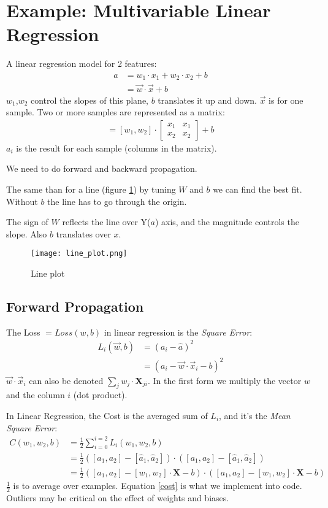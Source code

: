 \section{Example: Multivariable Linear Regression}
A linear regression model for 2 features:
\begin{align*}
 a &= w_1\cdot x_1 + w_2\cdot x_2 + b \\
   &= \vec{w}\cdot\vec{x} + b
\end{align*}
$w_1$,$w_2$ control the slopes of this plane, $b$ translates it up and down. $\vec{x}$ is for one sample. Two or more samples are represented as a matrix:
\begin{align*}
[a_1, a_2] = 
  [w_1, w_2]\cdot{}
  \begin{bmatrix}
  x_1 & x_1\\
  x_2 & x_2 
  \end{bmatrix}
 +  b
\end{align*}
$a_i$ is the result for each sample (columns in the matrix).

We need to do forward and backward propagation.

The same than for a line (figure \ref{fig:line}) by tuning $W$ and $b$  we can find the best fit. Without $b$ the line has to go through the origin. 

The sign of $W$ reflects the line over Y($a$) axis, and the magnitude controls the slope. Also $b$ translates over $x$.

\begin{figure}[h]
 \centering
 \texttt{[image: line\_plot.png]}
  \caption{Line plot} \label{fig:line}
\end{figure}


\subsection{Forward Propagation}
The Loss $= Loss(w,b)$ in linear regression is the \textit{Square Error}:
\begin{align*}
  L_i(\vec{w}, b) &= (a_i - \hat{a})^2\\
  &=(a_i -\vec{w}\cdot{}\vec{x}_{i} -b)^2
\end{align*}
$\vec{w}\cdot{}\vec{x}_i$ can also be denoted $\sum_jw_j\cdot{}\mathbf{X}_{ji}$. In the first form we multiply the vector $w$ and the column $i$ (dot product).

In Linear Regression, the Cost is the averaged sum of $L_i$, and it's the \textit{Mean Square Error}:
\begin{align}
  C(w_1, w_2, b) &= \frac{1}{2} \sum_{i=0}^{i=2} L_i(w_1, w_2, b)\nonumber\\
  &= \frac{1}{2}([a_1, a_2] - [\hat{a}_1, \hat{a}_2])\cdot{}([a_1, a_2]-[\hat{a}_1, \hat{a}_2])\nonumber\\
  &=\frac{1}{2}([a_1, a_2] - [w_1, w_2]\cdot{}\mathbf{X}-b)\cdot{}([a_1, a_2] - [w_1,w_2]\cdot{}\mathbf{X} -b) \label{cost}
\end{align}
$\frac{1}{2}$ is to average over examples. Equation \ref{cost} is what we implement into code.
Outliers may be critical on the effect of weights and biases.

